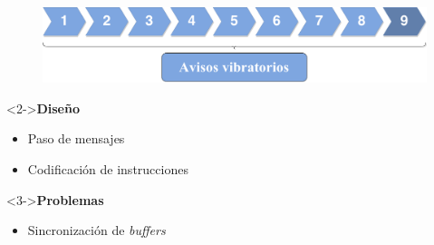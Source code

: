 \begin{slide}
  \begin{center}
    \begin{figure}[!h]
      \includegraphics[height=0.27\textheight]{img/ite9.png}
    \end{figure}
    \vspace{0.5cm}
    \begin{minipage}[b]{0.4\linewidth}
      \begin{block}<2->{\textbf{Diseño}}
        \begin{itemize}
          \item Paso de mensajes
          \item Codificación de instrucciones
        \end{itemize}
      \end{block}
    \end{minipage}
    \hspace{0.5cm}
    \begin{minipage}[b]{0.4\linewidth}
      \begin{block}<3->{\textbf{Problemas}}
        \begin{itemize}
          \item Sincronización de \emph{buffers}
        \end{itemize}
      \end{block}
    \end{minipage}
  \end{center}
\end{slide}

